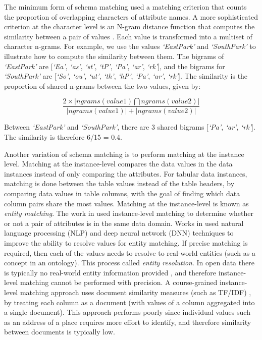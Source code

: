 The minimum form of schema matching used a matching criterion that counts the proportion of overlapping characters of attribute names. A more sophisticated criterion at the character level is an N-gram distance function that computes the similarity between a pair of values \cite{loper-bird-2002-nltk}. Each value is transformed into a multiset of character n-grams. For example, we use the values \textit{`EastPark'} and \textit{`SouthPark'} to illustrate how to compute the similarity between them. The bigrams of \textit{`EastPark'} are [\textit{`Ea'}, \textit{`as'}, \textit{`st'}, \textit{`tP'}, \textit{`Pa'}, \textit{`ar'}, \textit{`rk'}], and the bigrams for \textit{`SouthPark'} are [\textit{`So'}, \textit{`ou'}, \textit{`ut'}, \textit{`th'}, \textit{`hP'}, \textit{`Pa'}, \textit{`ar'}, \textit{`rk'}]. The similarity is the proportion of shared n-grams between the two values, given by:

\[
\frac{2\times \left|ngrams(value1)\bigcap ngrams(value2)\right|}{\left|ngrams(value1)\right|+\left|ngrams(value2)\right|}
\]

Between \textit{`EastPark'} and \textit{`SouthPark'}, there are 3 shared bigrams [\textit{`Pa'}, \textit{`ar'}, \textit{`rk'}]. The similarity is therefore 6/15 = 0.4.

Another variation of schema matching is to perform matching at the instance level. Matching at the instance-level compares the data values in the data instances instead of only comparing the attributes. For tabular data instances, matching is done between the table values instead of the table headers, by comparing data values in table columns, with the goal of finding which data column pairs share the most values. Matching at the instance-level is known as \textit{entity matching}. The work in \cite{Mudgal2018Deep} used instance-level matching to determine whether or not a pair of attributes is in the same data domain. Works in \cite{Rahm2016Case} used natural language processing (NLP) and deep neural network (DNN) techniques to improve the ability to resolve values for entity matching. If precise matching is required, then each of the values needs to resolve to real-world entities (such as a concept in an ontology). This process called \textit{entity resolution}. In open data there is typically no real-world entity information provided \cite{books/sp/bellahsene11}, and therefore instance-level matching cannot be performed with precision. A course-grained instance-level matching approach uses document similarity measures (such as TF/IDF) \cite{Duchateau2009YAM}, by treating each column as a document (with values of a column aggregated into a single document). This approach performs poorly since individual values such as an address of a place requires more effort to identify, and therefore similarity between documents is typically low.

